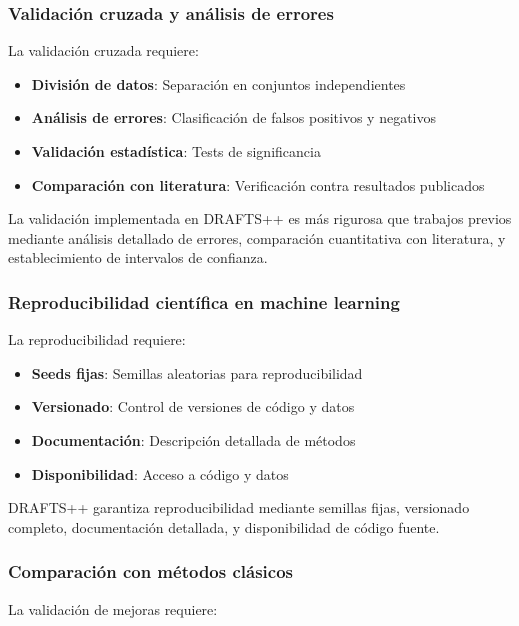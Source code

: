 \subsubsection{Validación cruzada y análisis de errores}

La validación cruzada requiere:

\begin{itemize}
    \item \textbf{División de datos}: Separación en conjuntos independientes
    \item \textbf{Análisis de errores}: Clasificación de falsos positivos y negativos
    \item \textbf{Validación estadística}: Tests de significancia
    \item \textbf{Comparación con literatura}: Verificación contra resultados publicados
\end{itemize}

La validación implementada en DRAFTS++ es más rigurosa que trabajos previos mediante análisis detallado de errores, comparación cuantitativa con literatura, y establecimiento de intervalos de confianza.

\subsubsection{Reproducibilidad científica en machine learning}

La reproducibilidad requiere:

\begin{itemize}
    \item \textbf{Seeds fijas}: Semillas aleatorias para reproducibilidad
    \item \textbf{Versionado}: Control de versiones de código y datos
    \item \textbf{Documentación}: Descripción detallada de métodos
    \item \textbf{Disponibilidad}: Acceso a código y datos
\end{itemize}

DRAFTS++ garantiza reproducibilidad mediante semillas fijas, versionado completo, documentación detallada, y disponibilidad de código fuente.

\subsubsection{Comparación con métodos clásicos}

La validación de mejoras requiere:

